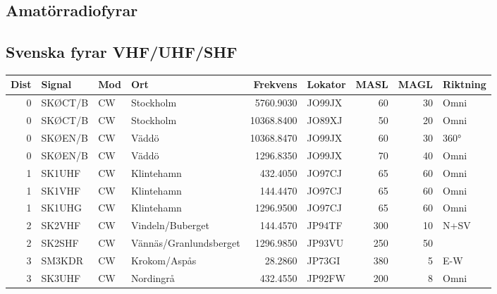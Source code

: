 {\clearpage

\begin{landscape}
\section{Amatörradiofyrar}
\subsection{Svenska fyrar VHF/UHF/SHF}
\begin{longtable}{rlllrlrrl}
	          \bf Dist & \bf Signal & \bf Mod & \bf Ort                & \bf Frekvens & \bf Lokator & \bf MASL & \bf MAGL & \bf Riktning \\ \hline
	\endhead
	                 0 & SKØCT/B    & CW      & Stockholm              &    5760.9030 & JO99JX      &       60 &       30 & Omni         \\
	                 0 & SKØCT/B    & CW      & Stockholm              &   10368.8400 & JO89XJ      &       50 &       20 & Omni         \\
	                 0 & SKØEN/B    & CW      & Väddö                  &   10368.8470 & JO99JX      &       60 &       30 & 360°         \\
	                 0 & SKØEN/B    & CW      & Väddö                  &    1296.8350 & JO99JX      &       70 &       40 & Omni         \\
	                 1 & SK1UHF     & CW      & Klintehamn             &     432.4050 & JO97CJ      &       65 &       60 & Omni         \\
	                 1 & SK1VHF     & CW      & Klintehamn             &     144.4470 & JO97CJ      &       65 &       60 & Omni         \\
	                 1 & SK1UHG     & CW      & Klintehamn             &    1296.9500 & JO97CJ      &       65 &       60 & Omni         \\
	                 2 & SK2VHF     & CW      & Vindeln/Buberget       &     144.4570 & JP94TF      &      300 &       10 & N+SV         \\
	                 2 & SK2SHF     & CW      & Vännäs/Granlundsberget &    1296.9850 & JP93VU      &      250 &       50 &              \\
	                 3 & SM3KDR     & CW      & Krokom/Aspås           &      28.2860 & JP73GI      &      380 &        5 & E-W          \\
	                 3 & SK3UHF     & CW      & Nordingrå              &     432.4550 & JP92FW      &      200 &        8 & Omni         \\

\end{longtable}
\end{landscape}}
